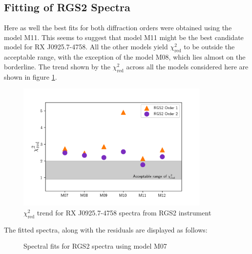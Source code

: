 		\clearpage
		\subsection{Fitting of RGS2 Spectra} \label{hi-resolution:analysis:rgs2}
			Here as well the best fits for both diffraction orders were obtained using the model M11. This seems to suggest that model M11 might be the best candidate model for RX J0925.7-4758. All the other models yield $\chi^2_\text{red}$ to be outside the acceptable range, with the exception of the model M08, which lies almost on the borderline. The trend shown by the $\chi^2_\text{red}$ across all the models considered here are shown in figure \ref{fig:mrvel-rgs2-chisq}.
			
			\begin{figure}[h!]
				\centering
				\caption{$\chi^2_\text{red}$ trend for RX J0925.7-4758 spectra from RGS2 instrument}
				\label{fig:mrvel-rgs2-chisq}
				\includegraphics[width=0.85\textwidth]{mrvel-rgs2-chisq}
			\end{figure}
			The fitted spectra, along with the residuals are displayed as follows:
			\begin{figure}[h!]
				\centering
				\caption{Spectral fits for RGS2 spectra using model M07}
				\label{xmm:rgs2-m07}
			\end{figure}
